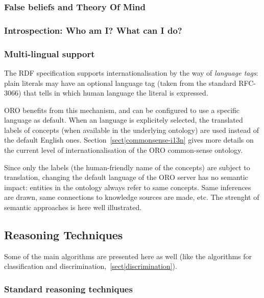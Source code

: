 \subsubsection{False beliefs and Theory Of Mind}
\label{sect|theory-of-mind}



\subsubsection{Introspection: Who am I? What can I do?}

\subsubsection{Multi-lingual support}
\label{sect|multilingual}

The RDF specification supports internationalisation by the way of
\emph{language tags}: plain literals may have an optional language tag (taken
from the standard RFC-3066) that tells in which human language the literal is
expressed.

ORO benefits from this mechanism, and can be configured to use a specific
language as default. When an language is explicitely selected, the translated
labels of concepts (when available in the underlying ontology) are used instead
of the default English ones. Section~\ref{sect|commonsense-i13n} gives more
details on the current level of internationalisation of the ORO common-sense
ontology.

Since only the labels (\ie the human-friendly name of the concepts) are subject
to translation, changing the default language of the ORO server has no semantic
impact: entities in the ontology always refer to same concepts. Same inferences
are drawn, same connections to knowledge sources are made, etc. The strenght of
semantic approaches is here well illustrated.

\subsection{Reasoning Techniques}

Some of the main algorithms are presented here as well (like the algorithms for
classification and discrimination,~\ref{sect|discrimination}).


\subsubsection{Standard reasoning techniques}


